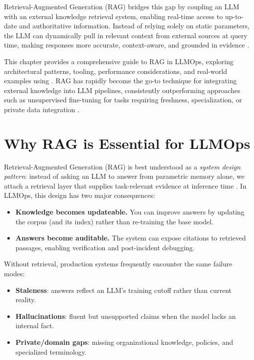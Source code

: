 Retrieval-Augmented Generation (RAG) bridges this gap by coupling an LLM with an external knowledge retrieval system, enabling real-time access to up-to-date and authoritative information. Instead of relying solely on static parameters, the LLM can dynamically pull in relevant context from external sources at query time, making responses more accurate, context-aware, and grounded in evidence \cite{Guu2020REALM,Izacard2020Fusion}. 

This chapter provides a comprehensive guide to RAG in LLMOps, exploring architectural patterns, tooling, performance considerations, and real-world examples using \ishtar{}. RAG has rapidly become the go-to technique for integrating external knowledge into LLM pipelines, consistently outperforming approaches such as unsupervised fine-tuning for tasks requiring freshness, specialization, or private data integration \cite{Borgeaud2022RETRO,Thakur2021BEIR,ragas_eacl2024}.


\section{Why RAG is Essential for LLMOps}
\label{sec:rag-why-rag-is-essential-for-llmops}
Retrieval-Augmented Generation (RAG) is best understood as a \emph{system design pattern}: instead of asking an LLM to answer from parametric memory alone, we attach a retrieval layer that supplies task-relevant evidence at inference time \cite{Lewis2020RAG,Guu2020REALM}. In LLMOps, this design has two major consequences:

\begin{itemize}
    \item \textbf{Knowledge becomes updateable.} You can improve answers by updating the corpus (and its index) rather than re-training the base model.
    \item \textbf{Answers become auditable.} The system can expose citations to retrieved passages, enabling verification and post-incident debugging.
\end{itemize}

Without retrieval, production systems frequently encounter the same failure modes:

\begin{itemize}
    \item \textbf{Staleness}: answers reflect an LLM's training cutoff rather than current reality.
    \item \textbf{Hallucinations}: fluent but unsupported claims when the model lacks an internal fact.
    \item \textbf{Private/domain gaps}: missing organizational knowledge, policies, and specialized terminology.
\end{itemize}

